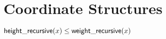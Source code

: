 \chapter{Coordinate Structures}

\begin{lemma}
	$\mathsf{height\_recursive}(x) \leq \mathsf{weight\_recursive}(x)$
\end{lemma}
